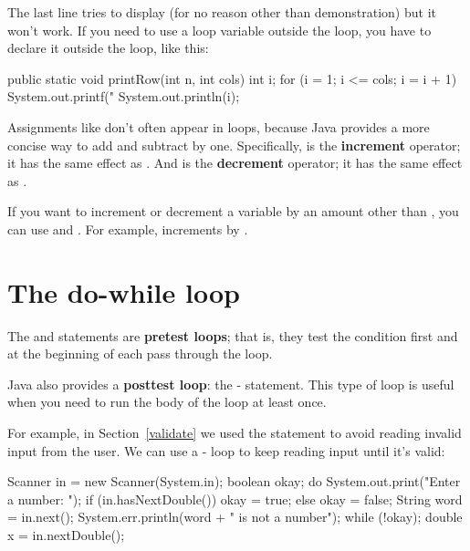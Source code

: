 The last line tries to display  (for no reason other than demonstration) but it won't work.
If you need to use a loop variable outside the loop, you have to declare it outside the loop, like this:

\begin{code}
public static void printRow(int n, int cols) {
    int i;
    for (i = 1; i <= cols; i = i + 1) {
        System.out.printf("%
    }
    System.out.println(i);
}
\end{code}


Assignments like  don't often appear in  loops, because Java provides a more concise way to add and subtract by one.
Specifically, \java{++} is the {\bf increment} operator; it has the same effect as .
And \java{--} is the {\bf decrement} operator; it has the same effect as .

If you want to increment or decrement a variable by an amount other than , you can use \java{+=} and \java{-=}.
For example,  increments  by .


\section{The do-while loop}


The  and  statements are {\bf pretest loops}; that is, they test the condition first and at the beginning of each pass through the loop.


Java also provides a {\bf posttest loop}: the - statement.
This type of loop is useful when you need to run the body of the loop at least once.


For example, in Section~\ref{validate} we used the  statement to avoid reading invalid input from the user.
We can use a - loop to keep reading input until it's valid:

\begin{code}
Scanner in = new Scanner(System.in);
boolean okay;
do {
    System.out.print("Enter a number: ");
    if (in.hasNextDouble()) {
        okay = true;
    } else {
        okay = false;
        String word = in.next();
        System.err.println(word + " is not a number");
    }
} while (!okay);
double x = in.nextDouble();
\end{code}

